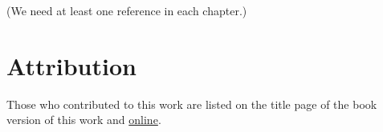 \medskip\noindent


(We need at least one reference \cite{reference} in each chapter.)


\section{Attribution}
\label{section-attribution}


\medskip\noindent
Those who contributed to this work are listed on the title page of the book
version of this work and
\href{https://automorphic.jh.edu/contributors}{online}.







